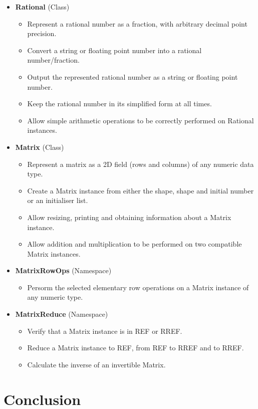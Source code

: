 \documentclass[11pt, a4paper]{article}
\begin{document}
\begin{itemize}
  \item \textbf{Rational} (Class)
  \begin{itemize}
    \item Represent a rational number as a fraction, with arbitrary decimal point precision.
    \item Convert a string or floating point number into a rational number/fraction.
    \item Output the represented rational number as a string or floating point number.
    \item Keep the rational number in its simplified form at all times.
    \item Allow simple arithmetic operations to be correctly performed on Rational instances.
  \end{itemize}
  \item \textbf{Matrix} (Class)
  \begin{itemize}
    \item Represent a matrix as a 2D field (rows and columns) of any numeric data type.
    \item Create a Matrix instance from either the shape, shape and initial number or an initialiser list.
    \item Allow resizing, printing and obtaining information about a Matrix instance.
    \item Allow addition and multiplication to be performed on two compatible Matrix instances.
  \end{itemize}
  \item \textbf{MatrixRowOps} (Namespace)
  \begin{itemize}
    \item Persorm the selected elementary row operations on a Matrix instance of any numeric type.
  \end{itemize}
  \item \textbf{MatrixReduce} (Namespace)
  \begin{itemize}
    \item Verify that a Matrix instance is in REF or RREF.
    \item Reduce a Matrix instance to REF, from REF to RREF and to RREF.
    \item Calculate the inverse of an invertible Matrix.
  \end{itemize}
\end{itemize}



\section{Conclusion}
\end{document}
